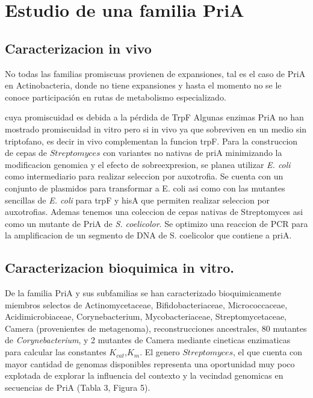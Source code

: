 \documentclass[12pt,twoside]{reedthesis}
\begin{document}
  \section{Estudio de una familia PriA}\label{estudio-de-una-familia-pria}
  
  \subsection{Caracterizacion in vivo}\label{caracterizacion-in-vivo}
  
  No todas las familias promiscuas provienen de expansiones, tal es el
  caso de PriA en Actinobacteria, donde no tiene expansiones y hasta el
  momento no se le conoce participación en rutas de metabolismo
  especializado.
  
  cuya promiscuidad es debida a la pérdida de TrpF Algunas enzimas PriA no
  han mostrado promiscuidad in vitro pero si in vivo ya que sobreviven en
  un medio sin triptofano, es decir in vivo complementan la funcion trpF.
  Para la construccion de cepas de \(Streptomyces\) con variantes no
  nativas de priA minimizando la modificacion genomica y el efecto de
  sobreexpresion, se planea utilizar \emph{E. coli} como intermediario
  para realizar seleccion por auxotrofia. Se cuenta con un conjunto de
  plasmidos para transformar a E. coli asi como con las mutantes sencillas
  de \emph{E. coli} para trpF y hisA que permiten realizar seleccion por
  auxotrofias. Ademas tenemos una coleccion de cepas nativas de
  Streptomyces asi como un mutante de PriA de \emph{S. coelicolor}. Se
  optimizo una reaccion de PCR para la amplificacion de un segmento de DNA
  de S. coelicolor que contiene a priA.
  
  \subsection{Caracterizacion bioquimica in
  vitro.}\label{caracterizacion-bioquimica-in-vitro.}
  
  De la familia PriA y sus subfamilias se han caracterizado
  bioquimicamente miembros selectos de Actinomycetaceae,
  Bifidobacteriaceae, Micrococcaceae, Acidimicrobiaceae, Corynebacterium,
  Mycobacteriaceae, Streptomycetaceae, Camera (provenientes de
  metagenoma), reconstrucciones ancestrales, 80 mutantes de
  \emph{Corynebacterium}, y 2 mutantes de Camera mediante cineticas
  enzimaticas para calcular las constantes \(K_{cat}\),\(K_m\). El genero
  \(Streptomyces\), el que cuenta con mayor cantidad de genomas
  disponibles representa una oportunidad muy poco explotada de explorar la
  influencia del contexto y la vecindad genomicas en secuencias de PriA
  (Tabla 3, Figura 5).
  
\end{document}
